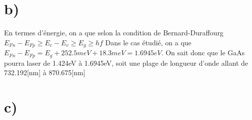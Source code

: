 \section{b)}
En termes d'énergie, on a que selon la condition de Bernard-Duraffourg $E_{Fn} - E_{Fp} \geq E_c - E_v \geq E_g \geq hf$ Dans le cas étudié, on a que $E_{Fn} - E_{Fp} = E_g + 252.5meV + 18.3meV = 1.6945eV$. On sait donc que le GaAs pourra laser de 1.424eV à 1.6945eV, soit une plage de longueur d'onde allant de 732.192[nm] à 870.675[nm]

\section{c)}